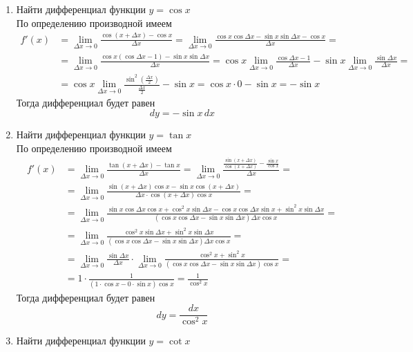 \documentclass[12pt]{article}
\begin{document}
\begin{enumerate}
\[	\]
	Тогда дифференциал будет равен
	\[
		dy = \cos{x} \, dx
	\]
\item {\hywenhei Найти дифференциал функции $y = \cos{x}$} \\
	По определению производной имеем
	\[
	\begin{aligned}
		f'(x) &= \lim_{\Delta x \to 0}\frac{\cos{(x + \Delta x)} - \cos{x}}{\Delta x} = \lim_{\Delta x \to 0}\frac{\cos{x}\cos{\Delta x} - \sin{x}\sin{\Delta x} - \cos{x}}{\Delta x} = \\
			  &= \lim_{\Delta x \to 0}\frac{\cos{x}(\cos{\Delta x} - 1) - \sin{x}\sin{\Delta x}}{\Delta x} = \cos{x} \lim_{\Delta x \to 0}\frac{\cos{\Delta x} - 1}{\Delta x} - \sin{x} \lim_{\Delta x \to 0}\frac{\sin{\Delta x}}{\Delta x} = \\
			  &= \cos{x} \lim_{\Delta x \to 0}\frac{\sin^2(\frac{\Delta x}{2})}{\frac{\Delta x}{2}} - \sin{x} = \cos{x} \cdot 0 - \sin{x} = -\sin{x}
	\end{aligned}
	\]
	Тогда дифференциал будет равен
	\[
		dy = - \sin{x} \, dx
	\]
\item {\hywenhei Найти дифференциал функции $y = \tan{x}$} \\
	По определению производной имеем
	\[
	\begin{aligned}
		f'(x) &= \lim_{\Delta x \to 0}\frac{\tan{(x + \Delta x)} - \tan{x}}{\Delta x} = \lim_{\Delta x \to 0}\frac{\frac{\sin{(x + \Delta x)}}{\cos{(x + \Delta x)}} - \frac{\sin{x}}{\cos{x}}}{\Delta x} = \\
			  &= \lim_{\Delta x \to 0}\frac{\sin{(x + \Delta x)}\cos{x} - \sin{x}\cos{(x + \Delta x)}}{\Delta x \cdot \cos{(x + \Delta x)}\cos{x}} = \\
			  &= \lim_{\Delta x \to 0}\frac{\sin x\cos\Delta x\cos x + \cos^2 x\sin\Delta x - \cos x\cos\Delta x\sin x + \sin^2 x\sin \Delta x}{(\cos x\cos\Delta x - \sin x\sin\Delta x)\Delta x\cos x} = \\
			  &= \lim_{\Delta x \to 0}\frac{\cos^2 x\sin\Delta x + \sin^2 x\sin \Delta x}{(\cos x\cos\Delta x - \sin x\sin\Delta x)\Delta x\cos x} = \\
			  &= \lim_{\Delta x \to 0}\frac{\sin\Delta x}{\Delta x} \cdot \lim_{\Delta x \to 0}\frac{\cos^2 x + \sin^2 x}{(\cos x\cos\Delta x - \sin x\sin\Delta x)\cos x} = \\
			  &= 1 \cdot \frac{1}{(1\cdot\cos x - 0\cdot\sin x)\cos x} = \frac{1}{\cos^2 x}
	\end{aligned}
	\]
	Тогда дифференциал будет равен
	\[
		dy = \dfrac{dx}{\cos^2{x}}
	\]
\item {\hywenhei Найти дифференциал функции $y = \cot{x}$} \\

\end{enumerate}
\end{document}
